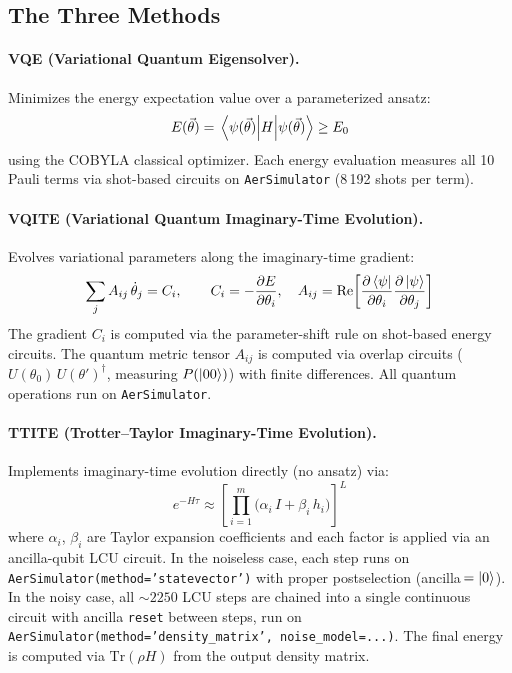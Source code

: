 \documentclass[11pt,a4paper]{article}
\begin{document}
\subsection{The Three Methods}

\paragraph{VQE (Variational Quantum Eigensolver).}
Minimizes the energy expectation value over a parameterized ansatz:
\begin{equation}
  E(\vec{\theta}) = \mel{\psi(\vec{\theta})}{H}{\psi(\vec{\theta})} \geq E_0
\end{equation}
using the COBYLA classical optimizer. Each energy evaluation measures
all 10 Pauli terms via shot-based circuits on \texttt{AerSimulator}
(8\,192 shots per term).

\paragraph{VQITE (Variational Quantum Imaginary-Time Evolution).}
Evolves variational parameters along the imaginary-time gradient:
\begin{equation}
  \sum_j A_{ij}\,\dot{\theta}_j = C_i, \qquad
  C_i = -\frac{\partial E}{\partial\theta_i}, \quad
  A_{ij} = \text{Re}\!\left[\frac{\partial\bra{\psi}}{\partial\theta_i}
    \frac{\partial\ket{\psi}}{\partial\theta_j}\right]
\end{equation}
The gradient $C_i$ is computed via the parameter-shift rule on shot-based
energy circuits. The quantum metric tensor $A_{ij}$ is computed via
overlap circuits ($U(\theta_0)\,U(\theta')^\dagger$, measuring $P(\ket{00})$)
with finite differences. All quantum operations run on \texttt{AerSimulator}.

\paragraph{TTITE (Trotter--Taylor Imaginary-Time Evolution).}
Implements imaginary-time evolution directly (no ansatz) via:
\begin{equation}
  e^{-H\tau} \approx \left[\prod_{i=1}^m \bigl(\alpha_i\,I + \beta_i\,h_i\bigr)\right]^L
\end{equation}
where $\alpha_i$, $\beta_i$ are Taylor expansion coefficients and each
factor is applied via an ancilla-qubit LCU circuit. In the noiseless
case, each step runs on \texttt{AerSimulator(method='statevector')}
with proper postselection (ancilla$\,=\ket{0}$). In the noisy case,
all $\sim\!2250$ LCU steps are chained into a single continuous circuit
with ancilla \texttt{reset} between steps, run on
\texttt{AerSimulator(method='density\_matrix', noise\_model=...)}.
The final energy is computed via $\text{Tr}(\rho H)$ from the
output density matrix.
\end{document}
